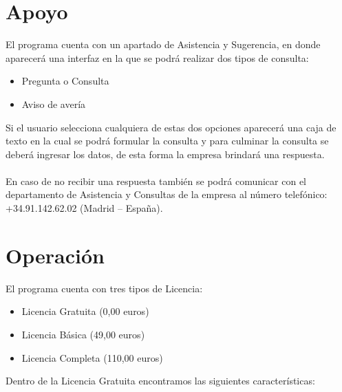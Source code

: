\documentclass[12pt,a4paper]{article}
\begin{document}
\section{Apoyo}\textbf{}
El programa cuenta con un apartado de Asistencia y Sugerencia, en donde aparecerá una interfaz en la que se podrá realizar dos tipos de consulta:
\begin{itemize}
\item Pregunta o Consulta
\item Aviso de avería
\end{itemize}
Si el usuario selecciona cualquiera de estas dos opciones aparecerá una caja de texto en la cual se podrá formular la consulta y para culminar la consulta se deberá ingresar los datos, de esta forma la empresa brindará una respuesta.\\\\
En caso de no recibir una respuesta también se podrá comunicar con el departamento de Asistencia y Consultas de la empresa al número telefónico:   +34.91.142.62.02 (Madrid – España).

\section{Operación}\textbf{}
El programa cuenta con tres tipos de Licencia:

\begin{itemize}
\item Licencia Gratuita (0,00 euros)
\item Licencia Básica (49,00 euros)
\item Licencia Completa (110,00 euros)\\
\end{itemize}

Dentro de la Licencia Gratuita encontramos las siguientes características:
\end{document}

